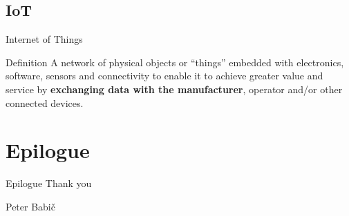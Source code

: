 \documentclass[hyperref={unicode}]{beamer}
\begin{document}
\subsection{IoT}

\begin{frame}{Internet of Things}
	\begin{block}{Definition}
	A network of physical objects or “things” embedded with electronics, software, sensors and connectivity to enable it to achieve greater value and service by \textbf{exchanging data with the manufacturer}, operator and/or other connected devices.
	\end{block}
\end{frame}


\section{Epilogue}

\begin{frame}{Epilogue}
	\centering
	{\large Thank you}

	\vskip 2cm
	Peter Babič

\end{frame}
\end{document}

